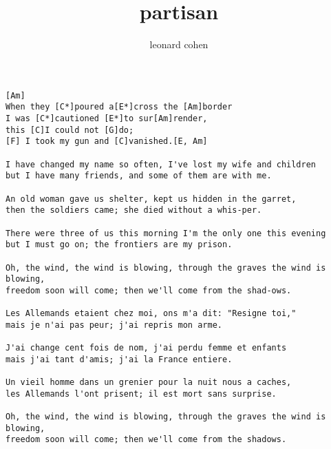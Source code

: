 \author{leonard cohen}
\title{partisan}
\maketitle
\begin{verbatim}
[Am]
When they [C*]poured a[E*]cross the [Am]border
I was [C*]cautioned [E*]to sur[Am]render,
this [C]I could not [G]do;
[F] I took my gun and [C]vanished.[E, Am]

I have changed my name so often, I've lost my wife and children
but I have many friends, and some of them are with me.

An old woman gave us shelter, kept us hidden in the garret,
then the soldiers came; she died without a whis-per.

There were three of us this morning I'm the only one this evening
but I must go on; the frontiers are my prison.

Oh, the wind, the wind is blowing, through the graves the wind is blowing,
freedom soon will come; then we'll come from the shad-ows.

Les Allemands etaient chez moi, ons m'a dit: "Resigne toi,"
mais je n'ai pas peur; j'ai repris mon arme.

J'ai change cent fois de nom, j'ai perdu femme et enfants
mais j'ai tant d'amis; j'ai la France entiere.

Un vieil homme dans un grenier pour la nuit nous a caches,
les Allemands l'ont prisent; il est mort sans surprise.

Oh, the wind, the wind is blowing, through the graves the wind is blowing,
freedom soon will come; then we'll come from the shadows.
\end{verbatim}